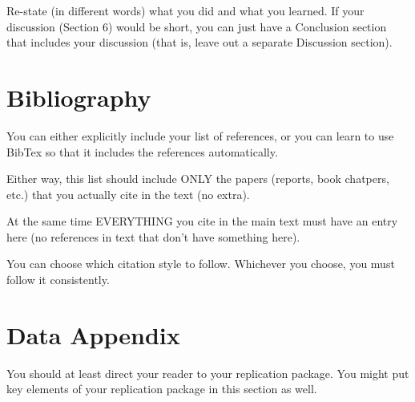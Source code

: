 \documentclass[12pt]{article}
\begin{document}
Re-state (in different words) what you did and what you learned. If your discussion (Section 6) would be short, you can just have a Conclusion section that includes your discussion (that is, leave out a separate Discussion section).

\newpage
\section*{Bibliography}
\singlespacing
\setlength\bibsep{0pt}

You can either explicitly include your list of references, or you can learn to use BibTex so that it includes the references automatically.

Either way, this list should include ONLY the papers (reports, book chatpers, etc.) that you actually cite in the text (no extra).

At the same time EVERYTHING you cite in the main text must have an entry here (no references in text that don't have something here).

You can choose which citation style to follow. Whichever you choose, you must follow it consistently.

\newpage
\section*{Data Appendix} \label{sec:appendixa}

You should at least direct your reader to your replication package. You might put key elements of your replication package in this section as well.
\end{document}
